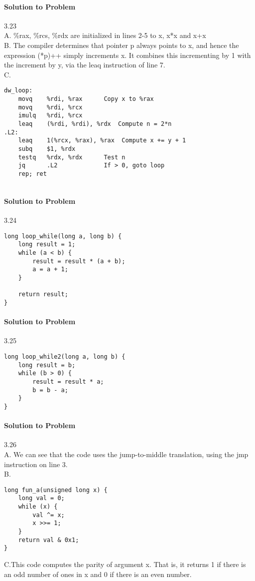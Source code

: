 \documentclass{report}
\begin{document}
\paragraph{Solution to Problem } 3.23 \\
A. \%rax, \%rcs, \%rdx are initialized in lines 2-5 to x, x*x and x+x \\
B. The compiler determines that pointer p always points to x, and hence the expression (*p)++ simply increments x. It combines this incrementing by 1 with the increment by y, via the leaq instruction of line 7. \\
C. 
\begin{lstlisting}
dw_loop:
    movq    %rdi, %rax      Copy x to %rax
    movq    %rdi, %rcx
    imulq   %rdi, %rcx
    leaq    (%rdi, %rdi), %rdx  Compute n = 2*n
.L2:
    leaq    1(%rcx, %rax), %rax  Compute x += y + 1
    subq    $1, %rdx
    testq   %rdx, %rdx      Test n
    jq      .L2             If > 0, goto loop
    rep; ret
    
\end{lstlisting}

\paragraph{Solution to Problem } 3.24 \\
\begin{lstlisting}
long loop_while(long a, long b) {
    long result = 1;
    while (a < b) {
        result = result * (a + b);
        a = a + 1;
    }
    
    return result;
}
\end{lstlisting}

\paragraph{Solution to Problem } 3.25 \\
\begin{lstlisting}
long loop_while2(long a, long b) {
    long result = b;
    while (b > 0) {
        result = result * a;
        b = b - a;
    }
}
\end{lstlisting}

\paragraph{Solution to Problem } 3.26 \\
A. We can see that the code uses the jump-to-middle translation, using the jmp instruction on line 3. \\
B.
\begin{lstlisting}
long fun_a(unsigned long x) {
    long val = 0;
    while (x) {
        val ^= x;
        x >>= 1;
    }
    return val & 0x1;
}
\end{lstlisting}
C.This code computes the parity of argument x. That is, it returns 1 if there is an odd number of ones in x and 0 if there is an even number.
\end{document}
